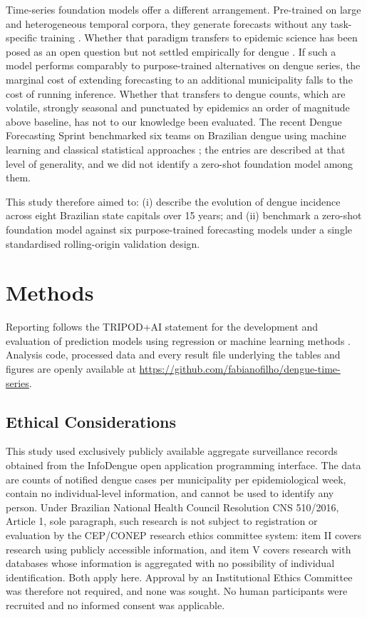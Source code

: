 \documentclass[11pt]{article}
\begin{document}
Time-series foundation models offer a different arrangement. Pre-trained on large and
heterogeneous temporal corpora, they generate forecasts without any task-specific
training \citep{Das2024timesfm,Ansari2024chronos,Woo2024moirai}. Whether that paradigm
transfers to epidemic science has been posed as an open question but not settled
empirically for dengue \citep{Lau2026foundation}. If such a model performs
comparably to purpose-trained alternatives on dengue series, the marginal cost of
extending forecasting to an additional municipality falls to the cost of running
inference. Whether that transfers to dengue counts, which are volatile, strongly seasonal
and punctuated by epidemics an order of magnitude above baseline, has not to our knowledge
been evaluated. The recent Dengue Forecasting Sprint benchmarked six teams on Brazilian
dengue using machine learning and classical statistical approaches
\citep{Araujo2026sprint}; the entries are described at that level of generality, and we
did not identify a zero-shot foundation model among them.

This study therefore aimed to: (i) describe the evolution of dengue incidence across
eight Brazilian state capitals over 15 years; and (ii) benchmark a zero-shot foundation
model against six purpose-trained forecasting models under a single standardised
rolling-origin validation design.

\section{Methods}

Reporting follows the TRIPOD+AI statement for the development and evaluation of
prediction models using regression or machine learning methods
\citep{Collins2024tripod}. Analysis code, processed data and every result file underlying
the tables and figures are openly available at
\url{https://github.com/fabianofilho/dengue-time-series}.

\subsection{Ethical Considerations}

This study used exclusively publicly available aggregate surveillance records obtained
from the InfoDengue open application programming interface. The data are counts of
notified dengue cases per municipality per epidemiological week, contain no
individual-level information, and cannot be used to identify any person. Under Brazilian
National Health Council Resolution CNS 510/2016, Article 1, sole paragraph, such research
is not subject to registration or evaluation by the CEP/CONEP research ethics committee
system: item II covers research using publicly accessible information, and item V covers
research with databases whose information is aggregated with no possibility of individual
identification. Both apply here. Approval by an
Institutional Ethics Committee was therefore not required, and none was sought. No human
participants were recruited and no informed consent was applicable.
\end{document}
